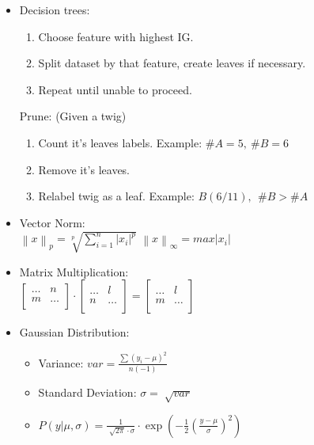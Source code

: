 \documentclass[twocolumn, 10pt]{article}
\begin{document}
\begin{itemize}[leftmargin=*, itemsep=0pt]
    \item Decision trees:
    \begin{enumerate}[topsep=0pt, itemsep=0pt]
        \item Choose feature with highest IG.
        \item Split dataset by that feature, create leaves if necessary.
        \item Repeat until unable to proceed.
    \end{enumerate}
    Prune: (Given a twig)
    \begin{enumerate}[topsep=0pt, itemsep=0pt]
        \item Count it's leaves labels. \; Example: $\#A=5, \ \#B=6$
        \item Remove it's leaves.
        \item Relabel twig as a leaf. \; Example: $B(6/11), \ \ \#B>\#A$ 
    \end{enumerate}

    \item Vector Norm: \\[2pt]
    $\displaystyle\left\lVert x\right\rVert _p=\sqrt[p]{\sum_{i=1}^n\left\lvert x_i\right\rvert ^p}$ \;\;\;\;\; $\displaystyle\left\lVert x\right\rVert _\infty=max \left\lvert x_i\right\rvert  $

    \newpage
    \item Matrix Multiplication: \\[3pt]
    $\begin{bmatrix}
        \ldots & n \\
        m & \ldots \\
    \end{bmatrix} \cdot
    \begin{bmatrix}
        \ldots & l \\
        n & \ldots \\
    \end{bmatrix} =
    \begin{bmatrix}
        \ldots  & l \\
        m  & \ldots \\
    \end{bmatrix}$

    \item Gaussian Distribution:
    \begin{itemize}[topsep=0pt]
        \item Variance: $\displaystyle var=\frac{\sum(y_i-\mu)^2}{n(-1)}$
        \item Standard Deviation: $\displaystyle \sigma=\sqrt[]{var}$
        \item $\displaystyle  P(y|\mu,\sigma)=\frac{1}{\sqrt[]{2\pi}\cdot\sigma}\cdot\exp\left(-\frac{1}{2}\left(\frac{y-\mu}{\sigma}\right)^2\right)$
    \end{itemize}


\end{itemize}
\end{document}
